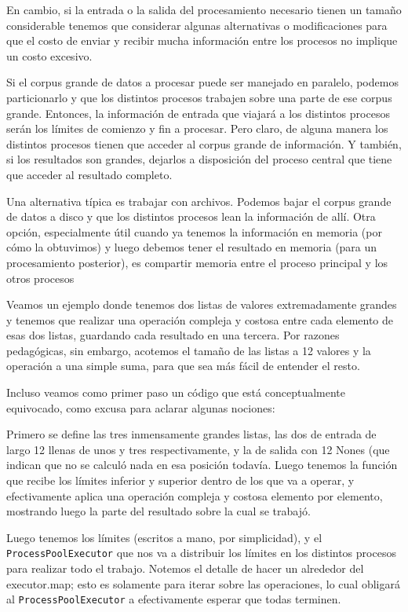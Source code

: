 En cambio, si la entrada o la salida del procesamiento necesario tienen un tamaño considerable tenemos que considerar algunas alternativas o modificaciones para que el costo de enviar y recibir mucha información entre los procesos no implique un costo excesivo.

Si el corpus grande de datos a procesar puede ser manejado en paralelo, podemos particionarlo y que los distintos procesos trabajen sobre una parte de ese corpus grande. Entonces, la información de entrada que viajará a los distintos procesos serán los límites de comienzo y fin a procesar. Pero claro, de alguna manera los distintos procesos tienen que acceder al corpus grande de información. Y también, si los resultados son grandes, dejarlos a disposición del proceso central que tiene que acceder al resultado completo.

Una alternativa típica es trabajar con archivos. Podemos bajar el corpus grande de datos a disco y que los distintos procesos lean la información de allí. Otra opción, especialmente útil cuando ya tenemos la información en memoria (por cómo la obtuvimos) y luego debemos tener el resultado en memoria (para un procesamiento posterior), es compartir memoria entre el proceso principal y los otros procesos

Veamos un ejemplo donde tenemos dos listas de valores extremadamente grandes y tenemos que realizar una operación compleja y costosa entre cada elemento de esas dos listas, guardando cada resultado en una tercera. Por razones pedagógicas, sin embargo, acotemos el tamaño de las listas a 12 valores y la operación a una simple suma, para que sea más fácil de entender el resto.

Incluso veamos como primer paso un código que está conceptualmente equivocado, como excusa para aclarar algunas nociones:


Primero se define las tres inmensamente grandes listas, las dos de entrada de largo 12 llenas de unos y tres respectivamente, y la de salida con 12 Nones (que indican que no se calculó nada en esa posición todavía. Luego tenemos la función que recibe los límites inferior y superior dentro de los que va a operar, y efectivamente aplica una operación compleja y costosa elemento por elemento, mostrando luego la parte del resultado sobre la cual se trabajó.

Luego tenemos los límites (escritos a mano, por simplicidad), y el \texttt{ProcessPoolExecutor} que nos va a distribuir los límites en los distintos procesos para realizar todo el trabajo. Notemos el detalle de hacer un  alrededor del {executor.map}; esto es solamente para iterar sobre las operaciones, lo cual obligará al \texttt{ProcessPoolExecutor} a efectivamente esperar que todas terminen.

